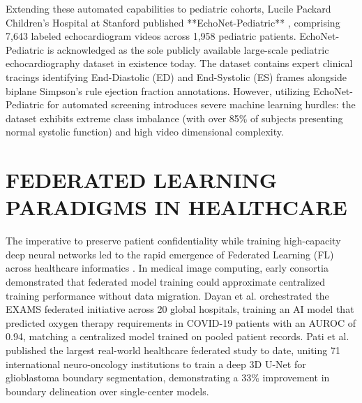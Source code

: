 \documentclass[12pt,a4paper]{amritareport}
\begin{document}
Extending these automated capabilities to pediatric cohorts, Lucile Packard Children's Hospital at Stanford published **EchoNet-Pediatric** \cite{ouyang2020video, he2023echonet}, comprising 7,643 labeled echocardiogram videos across 1,958 pediatric patients. EchoNet-Pediatric is acknowledged as the sole publicly available large-scale pediatric echocardiography dataset in existence today. The dataset contains expert clinical tracings identifying End-Diastolic (ED) and End-Systolic (ES) frames alongside biplane Simpson's rule ejection fraction annotations. However, utilizing EchoNet-Pediatric for automated screening introduces severe machine learning hurdles: the dataset exhibits extreme class imbalance (with over 85\% of subjects presenting normal systolic function) and high video dimensional complexity. 


\section{FEDERATED LEARNING PARADIGMS IN HEALTHCARE}

The imperative to preserve patient confidentiality while training high-capacity deep neural networks led to the rapid emergence of Federated Learning (FL) across healthcare informatics \cite{kaissis2020secure, xu2021federated}. In medical image computing, early consortia demonstrated that federated model training could approximate centralized training performance without data migration. Dayan et al. \cite{dayan2021federated} orchestrated the EXAMS federated initiative across 20 global hospitals, training an AI model that predicted oxygen therapy requirements in COVID-19 patients with an AUROC of 0.94, matching a centralized model trained on pooled patient records. Pati et al. \cite{pati2022federated} published the largest real-world healthcare federated study to date, uniting 71 international neuro-oncology institutions to train a deep 3D U-Net for glioblastoma boundary segmentation, demonstrating a 33\% improvement in boundary delineation over single-center models.
\end{document}
